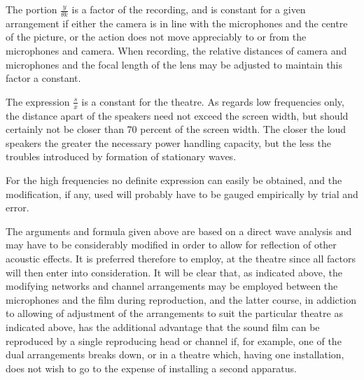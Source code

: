 \documentclass[11pt]{article}
\begin{document}
\begin{multicols*}{2}
The portion $\frac{y}{\theta k}$ is a factor of the recording, and is constant for a given arrangement if either the camera is in line with the microphones and the centre of the picture, or the action does not move appreciably to or from the microphones and camera. When recording, the relative distances of camera and microphones and the focal length of the lens may be adjusted to maintain this factor a constant.

The expression $\frac{s}{x}$ is a constant for the theatre. As regards low frequencies only, the distance apart of the speakers need not exceed the screen width, but should certainly not be closer than 70 percent of the screen width. The closer the loud speakers the greater the necessary power handling capacity, but the less the troubles introduced by formation of stationary waves.

For the high frequencies no definite expression can easily be obtained, and the modification, if any, used will probably have to be gauged empirically by trial and error.

The arguments and formula given above are based on a direct wave analysis and may have to be considerably modified in order to allow for reflection of other acoustic effects. It is preferred therefore to employ, at the theatre since all factors will then enter into consideration. It will be clear that, as indicated above, the modifying networks and channel arrangements may be employed between the microphones and the film during reproduction, and the latter course, in addiction to allowing of adjustment of the arrangements to suit the particular theatre as indicated above, has the additional advantage that the sound film can be reproduced by a single reproducing head or channel if, for example, one of the dual arrangements breaks down, or in a theatre which, having one installation, does not wish to go to the expense of installing a second apparatus.


\end{multicols*}
\end{document}
